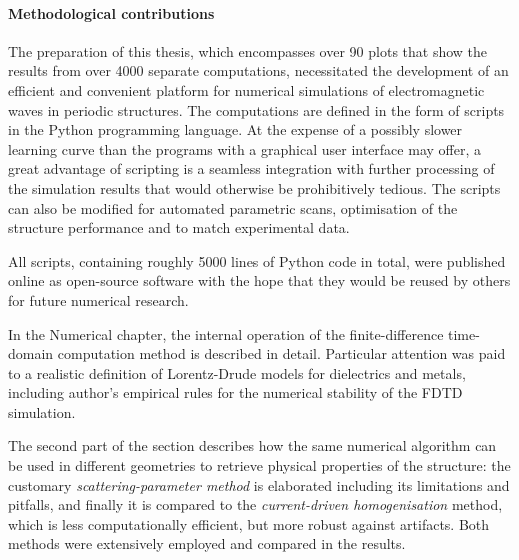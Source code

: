\paragraph{Methodological contributions}
The preparation of this thesis, which encompasses over 90 plots that show the results from over 4000 separate computations, necessitated the development of an efficient and convenient platform for numerical simulations of electromagnetic waves in periodic structures.
The computations are defined in the form of scripts in the Python programming language. At the expense of a possibly slower learning curve than the programs with a graphical user interface may offer, a great advantage of scripting is a seamless integration with further processing of the simulation results that would otherwise be prohibitively tedious. The scripts can also be modified for automated parametric scans, optimisation of the structure performance and to match experimental data.

All scripts, containing roughly 5000 lines of Python code in total, were published online as open-source software \cite{dominec2014_meep_metamaterials} with the hope that they would be reused by others for future numerical research.

In the Numerical chapter, the internal operation of the finite-difference time-domain computation method is described in detail. Particular attention was paid to a realistic definition of Lorentz-Drude models for dielectrics and metals, including author's empirical rules for the numerical stability of the FDTD simulation. 


The second part of the section describes how the same numerical algorithm can be used in different geometries to retrieve physical properties of the structure: the customary \textit{scattering-parameter method} is elaborated including its limitations and pitfalls, and finally it is compared to the \textit{current-driven homogenisation} method, which is less computationally efficient, but more robust against artifacts. Both methods were extensively employed and compared in the results.

